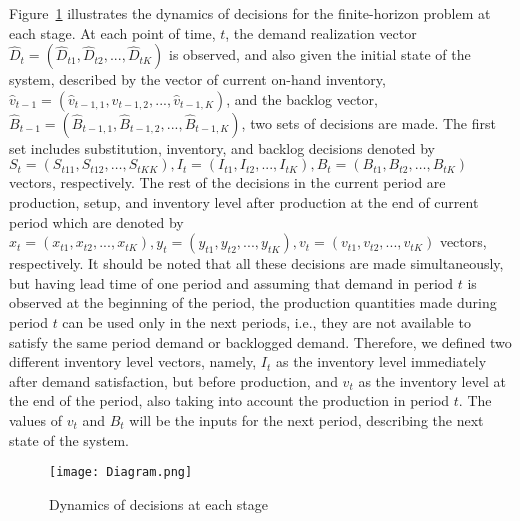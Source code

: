 \documentclass[11pt]{article}
\newcommand{\ti}{t} %
\newcommand{\Ka}{K}
\newcommand{\Bi}{B} %
\newcommand{\Vi}{v} %
\newcommand{\Es}{S} %
\newcommand{\InvPos}{inventory level after production }
\begin{document}
Figure~\ref{MultistageDynamics} illustrates the dynamics of decisions for the finite-horizon problem at each stage. 
At each point of time, $\ti$, the demand realization vector $\hat{D}_{\ti} =(\hat{D}_{\ti 1}, \hat{D}_{\ti 2},..., \hat{D}_{\ti \Ka})$ is observed, and also given the initial state of the system, described by the vector of current on-hand inventory, $\hat{\Vi}_{\ti-1} =(\hat{\Vi}_{\ti-1, 1}, \hat{\Vi}_{\ti-1, 2},..., \hat{\Vi}_{\ti-1, \Ka})$, and the backlog vector, $\hat{\Bi}_{\ti-1}=(\hat{\Bi}_{\ti-1, 1}, \hat{\Bi}_{\ti-1, 2},..., \hat{\Bi}_{\ti-1, \Ka})$, two sets of decisions are made.
The first set includes substitution, inventory, and backlog decisions denoted by ${\Es}_{\ti}= ({\Es}_{\ti 11}, {\Es}_{\ti 12},\hdots, {\Es}_{\ti \Ka \Ka}), I_{\ti} = ({I}_{\ti 1}, {I}_{\ti 2},..., {I}_{\ti \Ka}), {\Bi}_{\ti} =({\Bi}_{\ti 1}, {\Bi}_{\ti 2},\hdots, {\Bi}_{\ti \Ka})$ vectors, respectively. 
The rest of the decisions in the current period are production, setup, and \InvPos at the end of current period which are denoted by $x_{\ti} = (x_{\ti 1}, x_{\ti 2},..., x_{\ti \Ka}), y_{\ti} = ({y}_{\ti 1}, {y}_{\ti 2},..., {y}_{\ti \Ka}), \Vi_{\ti} = ({\Vi}_{\ti 1}, {\Vi}_{\ti 2},..., {\Vi}_{\ti \Ka})$ vectors, respectively. 
It should be noted that all these decisions are made simultaneously, but having lead time of one period and assuming that demand in period $\ti$ is observed at the beginning of the period, the production quantities made during period $\ti$ can be used only in the next periods, i.e., they are not available to satisfy the same period demand or backlogged demand. Therefore, we defined two different inventory level vectors, namely, $I_{\ti}$ as the inventory level immediately after demand satisfaction, but before production, and $\Vi_{\ti}$ as the inventory level at the end of the period, also taking into account the production in period $\ti$. 
The values of $\Vi_{\ti}$ and $\Bi_{\ti}$ will be the inputs for the next period, describing the next state of the system.
\begin{figure}[!h]
\begin{center}
\texttt{[image: Diagram.png]}
\caption{Dynamics of decisions at each stage} 
\label{MultistageDynamics}
\end{center}
\end{figure}
\end{document}
